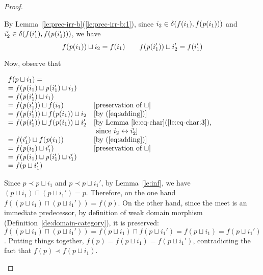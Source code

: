 \begin{proof}
\begin{itemize}
\begin{enumerate}[A.]
      By Lemma~\ref{le:prec-irr-b}(\ref{le:prec-irr-b:1}), since
      $i_2 \in \delta({f(i_1)},{f(\mathit{p}({i_1}))})$ and
      $i_2' \in \delta({f(i_1')},{f(\mathit{p}({i_1'}))})$, we have
      \begin{equation}
        \label{eq:adding}
        f(\mathit{p}({i_1})) \sqcup i_2 = f(i_1) 
        \qquad f(\mathit{p}({i_1'})) \sqcup i_2' = f(i_1')
      \end{equation}
          
      Now, observe that
      \begin{center}
      $\begin{array}{lll}
         f(p \sqcup i_1)  =  \\
         = f(\mathit{p}({i_1}) \sqcup \mathit{p}({i_1'}) \sqcup i_1)\\
         =  f(\mathit{p}({i_1'}) \sqcup i_1)\\
         =  f(\mathit{p}({i_1'})) \sqcup f(i_1) 
      & \mbox{[preservation of $\sqcup$]}\\
         =  f(\mathit{p}({i_1'})) \sqcup f(\mathit{p}({i_1})) \sqcup i_2 
      & \mbox{[by~(\ref{eq:adding})]}\\
         =   f(\mathit{p}({i_1'})) \sqcup f(\mathit{p}({i_1})) \sqcup i_2' 
      & \mbox{[by Lemma~\ref{le:eq-char}(\ref{le:eq-char:3}),} \\
         & \mbox{\ since $i_2 \leftrightarrow i_2'$]}\\
                          =  f(i_1') \sqcup f(\mathit{p}({i_1})) 
         & \mbox{[by~(\ref{eq:adding})]}\\
                          =  f(\mathit{p}({i_1}) \sqcup i_1')
         & \mbox{[preservation of $\sqcup$]}\\
                          =  f(\mathit{p}({i_1}) \sqcup \mathit{p}({i_1'}) \sqcup  i_1')\\
                          =  f(p \sqcup  i_1')\\
       \end{array}
       $
     \end{center}
     Since $p \prec p \sqcup i_1$ and $p \prec p \sqcup i_1'$, by
     Lemma~\ref{le:inf}, we have
     $(p \sqcup i_1) \sqcap (p \sqcup i_1') = p$.
     Therefore, on the one hand
     $f((p \sqcup i_1) \sqcap (p \sqcup i_1')) = f(p)$. On the other
     hand, since the meet is an immediate predecessor, by definition
     of weak domain morphism (Definition~\ref{de:domain-category}), it
     is preserved:
     $f((p \sqcup i_1) \sqcap (p \sqcup i_1')) = f(p \sqcup i_1)
     \sqcap f(p \sqcup i_1') = f(p \sqcup i_1) = f(p \sqcup i_1')$.
     Putting things together,
     $f(p) = f(p \sqcup i_1) = f(p \sqcup i_1')$, contradicting  the
     fact that $f(p) \prec f(p \sqcup i_1)$.
   \end{enumerate}
 

\end{itemize}
\end{proof}
